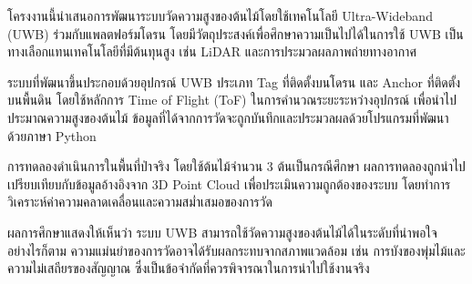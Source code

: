 \maketitle
\makesignature

\ifproject
\begin{abstractTH}
โครงงานนี้นำเสนอการพัฒนาระบบวัดความสูงของต้นไม้โดยใช้เทคโนโลยี Ultra-Wideband (UWB) ร่วมกับแพลตฟอร์มโดรน 
โดยมีวัตถุประสงค์เพื่อศึกษาความเป็นไปได้ในการใช้ UWB เป็นทางเลือกแทนเทคโนโลยีที่มีต้นทุนสูง เช่น LiDAR 
และการประมวลผลภาพถ่ายทางอากาศ

ระบบที่พัฒนาขึ้นประกอบด้วยอุปกรณ์ UWB ประเภท Tag ที่ติดตั้งบนโดรน และ Anchor ที่ติดตั้งบนพื้นดิน 
โดยใช้หลักการ Time of Flight (ToF) ในการคำนวณระยะระหว่างอุปกรณ์ เพื่อนำไปประมาณความสูงของต้นไม้ 
ข้อมูลที่ได้จากการวัดจะถูกบันทึกและประมวลผลด้วยโปรแกรมที่พัฒนาด้วยภาษา Python

การทดลองดำเนินการในพื้นที่ป่าจริง โดยใช้ต้นไม้จำนวน 3 ต้นเป็นกรณีศึกษา 
ผลการทดลองถูกนำไปเปรียบเทียบกับข้อมูลอ้างอิงจาก 3D Point Cloud เพื่อประเมินความถูกต้องของระบบ 
โดยทำการวิเคราะห์ค่าความคลาดเคลื่อนและความสม่ำเสมอของการวัด

ผลการศึกษาแสดงให้เห็นว่า ระบบ UWB สามารถใช้วัดความสูงของต้นไม้ได้ในระดับที่น่าพอใจ 
อย่างไรก็ตาม ความแม่นยำของการวัดอาจได้รับผลกระทบจากสภาพแวดล้อม เช่น การบังของพุ่มไม้และความไม่เสถียรของสัญญาณ 
ซึ่งเป็นข้อจำกัดที่ควรพิจารณาในการนำไปใช้งานจริง
\end{abstractTH}

\begin{abstract}
This project presents the development of a tree height measurement system using Ultra-Wideband (UWB) technology integrated with a drone platform. 
The objective is to investigate the feasibility of using UWB as a cost-effective alternative to conventional methods such as LiDAR and photogrammetry.

The proposed system consists of a UWB tag mounted on a drone and an anchor placed on the ground. 
The distance between devices is calculated using the Time of Flight (ToF) principle and used to estimate tree height. 
Measurement data are collected and processed using a Python-based application.

Experiments were conducted in a real forest environment using three sample trees. 
The results were compared with reference data obtained from a 3D point cloud to evaluate system accuracy. 
Error and consistency analyses were performed to assess measurement reliability.

The results indicate that the UWB-based system can provide a reasonable estimation of tree height. 
However, measurement accuracy is affected by environmental factors such as signal obstruction from foliage and signal instability, 
which should be considered for practical deployment.
\end{abstract}


